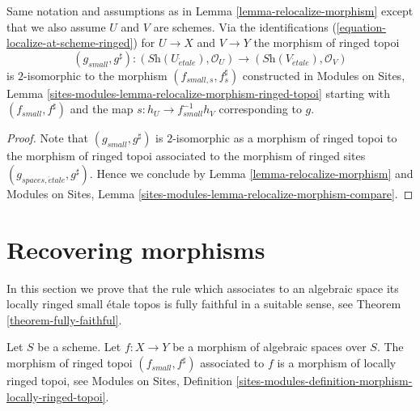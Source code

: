 \begin{lemma}
\label{lemma-relocalize-morphism-at-schemes}
Same notation and assumptions as in
Lemma \ref{lemma-relocalize-morphism}
except that we also assume $U$ and $V$ are schemes.
Via the identifications
(\ref{equation-localize-at-scheme-ringed})
for $U \to X$ and $V \to Y$ the morphism of ringed topoi
$$
(g_{small}, g^\sharp) :
(\textit{Sh}(U_{\acute{e}tale}), \mathcal{O}_U)
\longrightarrow
(\textit{Sh}(V_{\acute{e}tale}), \mathcal{O}_V)
$$
is $2$-isomorphic to the morphism $(f_{small, s}, f_s^\sharp)$
constructed in
Modules on Sites,
Lemma \ref{sites-modules-lemma-relocalize-morphism-ringed-topoi}
starting with $(f_{small}, f^\sharp)$ and
the map $s : h_U \to f_{small}^{-1}h_V$ corresponding to $g$.
\end{lemma}

\begin{proof}
Note that $(g_{small}, g^\sharp)$ is $2$-isomorphic as a
morphism of ringed topoi to the morphism of ringed topoi
associated to the morphism of ringed sites
$(g_{spaces, \acute{e}tale}, g^\sharp)$. Hence we conclude by
Lemma \ref{lemma-relocalize-morphism}
and
Modules on Sites,
Lemma \ref{sites-modules-lemma-relocalize-morphism-compare}.
\end{proof}












\section{Recovering morphisms}
\label{section-morphisms}

\noindent
In this section we prove that the rule which associates to an algebraic space
its locally ringed small \'etale topos is fully faithful in a suitable
sense, see
Theorem \ref{theorem-fully-faithful}.

\begin{lemma}
\label{lemma-morphism-locally-ringed}
Let $S$ be a scheme.
Let $f : X \to Y$ be a morphism of algebraic spaces over $S$.
The morphism of ringed topoi $(f_{small}, f^\sharp)$
associated to $f$ is a morphism of locally ringed topoi, see
Modules on Sites,
Definition \ref{sites-modules-definition-morphism-locally-ringed-topoi}.
\end{lemma}

